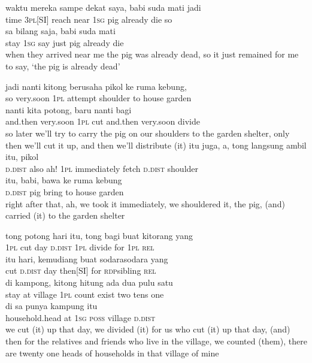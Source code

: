 \ea
\gll   waktu    {mereka}    {sampe}    {dekat}    {saya,}    {babi}   suda   mati   jadi\\
  time    {\textsc{3pl}[SI]}    {reach}    {near}    {\textsc{1sg}}    {pig}   already   die   so\\
   sa    {bilang}    {saja,}    {babi}    {suda}    {mati}\\
   {stay}   \textsc{1sg}    {say}    {just}    {pig}    {already}    {die}\\
\glt
when they arrived near me the pig was already dead, so it just remained for me to say, ‘the pig is already dead’
\z

\ea
\gll   jadi    {nanti}    {kitong}    {berusaha}   pikol   ke    {ruma}   kebung,\\
  so    {very.soon}    {\textsc{1pl}}    {attempt}   shoulder   to    {house}   garden\\
    {nanti}    {kita}   potong,   baru    {nanti}    {bagi}\\
   {and.then}    {very.soon}    {\textsc{1pl}}   cut   and.then    {very.soon}    {divide}\\
\glt
so later we’ll try to carry the pig on our shoulders to the garden shelter, only then we’ll cut it up, and then we’ll distribute (it)
\z
\ea
\gll   itu   juga,   a,    {tong}    {langsung}   ambil   itu,   pikol\\
  \textsc{d.dist}   also   ah!    {\textsc{1pl}}    {immediately}   fetch   \textsc{d.dist}   shoulder\\
\gll  itu,   babi,    {bawa}    {ke}   ruma    {kebung}\\
  \textsc{d.dist}   pig    {bring}    {to}   house    {garden}\\
\glt
right after that, ah, we took it immediately, we shouldered it, the pig, (and) carried (it) to the garden shelter
\z

\ea
\gll   tong    {potong}    {hari}    {itu,}    {tong}    {bagi}    {buat}    {kitorang}   yang\\
  \textsc{1pl}    {cut}    {day}    {\textsc{d.dist}}    {\textsc{1pl}}    {divide}    {for}    {\textsc{1pl}}   \textsc{rel}\\
    {itu}    {hari,}    {kemudiang}    {buat}    {sodara{\Tilde}sodara}    {yang}\\
   {cut}    {\textsc{d.dist}}    {day}    {then[SI]}    {for}    {\textsc{rdp}{\Tilde}sibling}    {\textsc{rel}}\\
    {di}    {kampong,}    {kitong}    {hitung}    {ada}    {dua}    {pulu}    {satu}\\
   {stay}    {at}    {village}    {\textsc{1pl}}    {count}    {exist}    {two}    {tens}    {one}\\
   di    {sa}    {punya}    {kampung}    {itu}\\
   {household.head}   at    {\textsc{1sg}}    {\textsc{poss}}    {village}    {\textsc{d.dist}}\\
\glt
we cut (it) up that day, we divided (it) for us who cut (it) up that day, (and) then for the relatives and friends who live in the village, we counted (them), there are twenty one heads of households in that village of mine
\z

